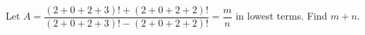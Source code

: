 Let $A=\dfrac{(2+0+2+3)!+(2+0+2+2)!}{(2+0+2+3)!-(2+0+2+2)!}=\dfrac{m}{n}$ in lowest terms. Find $m+n$.
